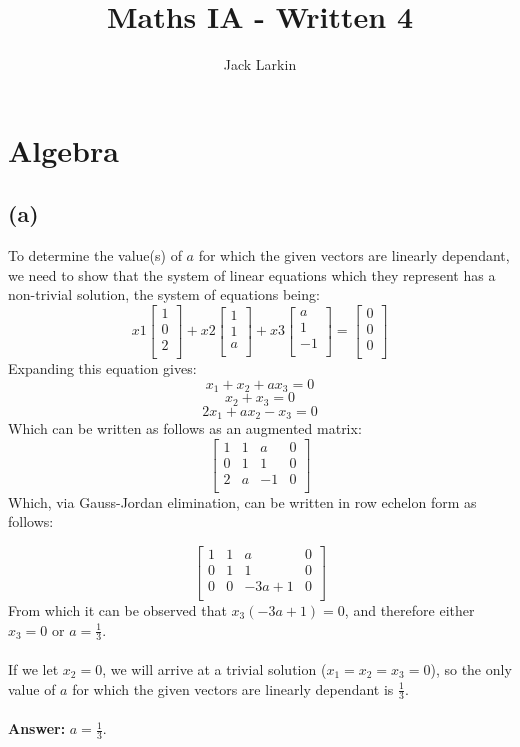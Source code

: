 \documentclass[11pt]{article}
\title{\textbf{Maths IA - Written 4}}
\date{}
\author{Jack Larkin}
\begin{document}
\maketitle

\section*{Algebra}
\subsection*{(a)}
To determine the value(s) of $a$ for which the given vectors are linearly dependant, we need to show that the system of linear equations which they represent has a non-trivial solution, the system of equations being:
$$x1
\begin{bmatrix}
1\\
0\\
2\\
\end{bmatrix}
+ x2
\begin{bmatrix}
1\\
1\\
a\\
\end{bmatrix}
+ x3
\begin{bmatrix}
a\\
1\\
-1\\
\end{bmatrix}
=
\begin{bmatrix}
0\\
0\\
0\\
\end{bmatrix}
$$
Expanding this equation gives:
$$x_1 + x_2 + ax_3 = 0$$
$$x_2 + x_3 = 0$$
$$2x_1 + ax_2 -x_3 = 0$$
Which can be written as follows as an augmented matrix:
$$\begin{bmatrix}
1 & 1 & a & 0\\
0 & 1 & 1 & 0\\
2 & a & -1 & 0\\
\end{bmatrix}$$
Which, via Gauss-Jordan elimination, can be written in row echelon form as follows:

$$\begin{bmatrix}
1 & 1 & a & 0\\
0 & 1 & 1 & 0\\
0 & 0 & -3a+1 & 0\\
\end{bmatrix}$$
From which it can be observed that $x_3(-3a+1)=0$, and therefore either $x_3=0$ or $a=\frac{1}{3}$.\\\\
If we let $x_2=0$, we will arrive at a trivial solution ($x_1 = x_2 = x_3 = 0$), so the only value of $a$ for which the given vectors are linearly dependant is $\frac{1}{3}$.\\
\\\textbf{Answer: } $a = \frac{1}{3}$.
\end{document}
